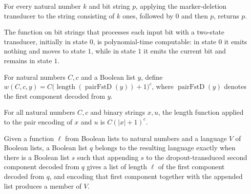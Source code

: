 \begin{theorem}
\label{Complexity.KarpLipton.dropMarker_marker}
\leanok
{}
For every natural number $k$ and bit string $p$, applying the marker-deletion transducer
to the string consisting of $k$ ones, followed by $0$ and then $p$, returns $p$.
\end{theorem}

\begin{theorem}
\label{Complexity.KarpLipton.polyTimeComputable_dropMarker}
\leanok
{}
The function on bit strings that processes each input bit with a two-state transducer,
initially in state $0$, is polynomial-time computable: in state $0$ it emits nothing and
moves to state $1$, while in state $1$ it emits the current bit and remains in state
$1$.
\end{theorem}

\begin{definition}
\label{Complexity.KarpLipton.wLen}
\leanok
{}
For natural numbers $C,c$ and a Boolean list $y$, define
$w(C,c,y)=C\bigl(\operatorname{length}(\operatorname{pairFstD}(y))+1\bigr)^c$, where
$\operatorname{pairFstD}(y)$ denotes the first component decoded from $y$.
\end{definition}

\begin{theorem}
\label{Complexity.KarpLipton.wLen_pairEncode}
\leanok
{}
For all natural numbers $C,c$ and binary strings $x,u$, the length function applied to
the pair encoding of $x$ and $u$ is $C(|x|+1)^c$.
\end{theorem}

\begin{definition}
\label{Complexity.KarpLipton.prefixLangOf}
\leanok
{}
Given a function $\ell$ from Boolean lists to natural numbers and a language $V$ of
Boolean lists, a Boolean list $q$ belongs to the resulting language exactly when there
is a Boolean list $s$ such that appending $s$ to the dropout-transduced second component
decoded from $q$ gives a list of length $\ell$ of the first component decoded from $q$,
and encoding that first component together with the appended list produces a member of
$V$.
\end{definition}

